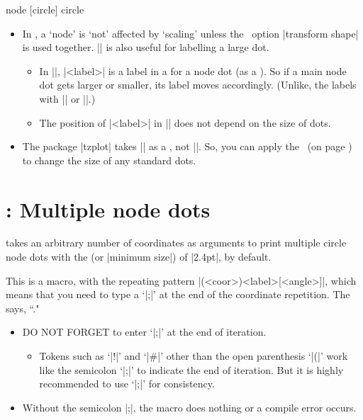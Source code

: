 \begin{tzcode}[listing only,colback=green!10!white]{.3}
node [circle]   \tzdot    \tzdots    \settzdotsize      [tzdot=2.4pt]  %
circle          \tzcdot   \tzcdots   \settzcdotradius   [tzcdot=1.2pt] %
\end{tzcode}

\remark 
\begin{itemize}
\item In \Tikz, a `node' is `not' affected by `scaling' unless the \Tikz\ option |transform shape| is used together.
|\tzdot| is also useful for labelling a large dot.
  \begin{itemize}
  \item In |\tzdot|, |<label>| is a label in a  for a node dot (as a ).
  So if a main node dot gets larger or smaller, its label moves accordingly. 
  (Unlike, the labels with |\tzcdot| or |\tzcdots|.)
  \item The position of |<label>| in |\tzcdot| does not depend on the size of dots.
  \end{itemize}
\item The package |tzplot| takes |\tzdot| as a , not |\tzcdot|.
So, you can apply the \threeways\ (on page \pageref{ss:threeways}) to change the size of any standard dots.
\end{itemize}


\section{\protect\cmd{\tzdots(*)}: Multiple node dots}
\label{s:tzdots}

\icmd{\tzdots} takes an arbitrary number of coordinates as arguments to print multiple circle node dots with the  (or |minimum size|) of |2.4pt|, by default.

This is a  macro, with the repeating pattern |(<coor>){<label>}[<angle>]|, which means that you need to type a  `|;|' at the end of the coordinate repetition. The  says, ``."

\remark
\begin{itemize}
\item DO NOT FORGET to enter `|;|' at the end of iteration.
  \begin{itemize}
  \item Tokens such as `|!|' and `|#|' other than the open parenthesis `|(|' work like the semicolon `|;|' to indicate the end of iteration.
        But it is highly recommended to use `|;|' for consistency.
  \end{itemize}
\item Without the semicolon |;|, the macro does nothing or a compile error occurs.
\end{itemize}

